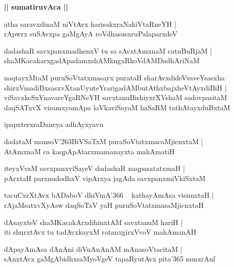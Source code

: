 \documentclass[twoside,12pt,openright]{book}
\def\S{\char'263}
\newcounter{shloka}[chapter]
\def\uvaca#1{\centerline{{\large\textbf{#1}}}}
\begin{document}
\uvaca{|| sumatiruvAca ||}

\begin{shloka}%
atha saravxdinaM niVtAvx harisakxraNakiVtaRneYH |\\
rApwrx suSAvxpa gaMgAyA roVdhasusxruPalaparxdeV 
\end{shloka}

\begin{shloka}%
dadashaR savxpanxmadhenxV tu sa sAvxtAmxnaM catuBuRjaM |\\
shaMKacakarxgadApadamxshAMkngxRkoVdAMDadhAriNaM 
\end{shloka}

\begin{shloka}%
naqtayxMtaM  puruSoVtatxmasayx purataH sharAvxdideVvaveYsasxha \\
shirxVmadiBxsasxvXtanUyuteYrarigadAMbutAthxbajxheVtAyxdiBiH |\\
viSavxkeSxVnavareYgaRNeYH savxtanuBishiyxrXVshaM sadovpasitaM \\
daqSATxvX visamxyamApa loVkaviSayaM haSaRM tathAtayxduBxtaM
\end{shloka}

\begin{center}
ipapxterxraDaneya adhAyxyavu
\end{center}

\begin{shloka}%
dadataM mansoV\S BiVSaTxM puraSoVtatxmacaMjicnxtaM |\\
AtAmxnaM ca kaqpApAtarxmamanayxta mahAmatiH
\end{shloka}

\begin{shloka}%
iteyxVvaM savxpanxviSayeV dadashaR naqpasatatxmaH |\\
pArxtaH parxnudodhxV vipArxya jagAda savxpanxmiVkiSxtaM 
\end{shloka}

\begin{shloka}%
tacuCxrXtAvx bADaboV dhiVmA\char'366 ~ kathayAmAsa visimxtaH |\\
rAjaMsatxvXyAsw daqSoTxV yaH puruSoVtatxmasaMjicnxtaH 
\end{shloka}

\begin{shloka}%
dAsayxteV shaMKacakArxdihinxtAM savxtanuM hariH |\\
iti shurxtAvx tu tadAvxkayxM ratanxgirxVvoV mahAmanAH 
\end{shloka}

\begin{shloka}%
dApayAmAsa dAnAni diVnAnAnAM mAnasoVtacitaM |\\
sAnxtAvx gaMgAbidhxsaMyoVgeV tapaRyutAvx pita\char'365 nunxrAnf
\end{shloka}
\end{document}
